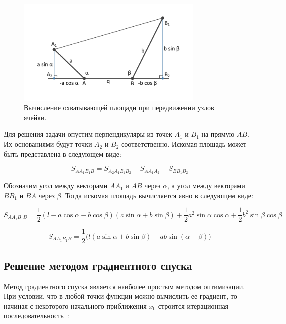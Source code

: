 \documentclass[
11pt,%
tightenlines,%
twoside,%
onecolumn,%
nofloats,%
nobibnotes,%
nofootinbib,%
superscriptaddress,%
noshowpacs,%
centertags]%
{revtex4}
\begin{document}
\begin{figure}[h]
\setcaptionmargin{5mm}
\onelinecaptionstrue
\includegraphics[width=0.8\textwidth]{pics/local.pdf}
\caption{Вычисление охватывающей площади при передвижении узлов ячейки.}
\label{fig:local}
\end{figure}

Для решения задачи опустим перпендикуляры из точек $A_1$ и $B_1$ на прямую $AB$.
Их основаниями будут точки $A_2$ и $B_2$ соответственно.
Искомая площадь может быть представлена в следующем виде:

\begin{equation}
S_{AA_1B_1B} = S_{A_2A_1B_1B_2} - S_{AA_1A_2} - S_{BB_1B_2}
\end{equation}

Обозначим угол между векторами $\overline{AA_1}$ и $\overline{AB}$ через $\alpha$, а угол между векторами $\overline{BB_1}$ и $\overline{BA}$ через $\beta$.
Тогда искомая площадь вычисляется явно в следующем виде:

\begin{equation}
S_{AA_1B_1B} = \frac{1}{2}(l - a \cos \alpha - b \cos \beta)(a \sin \alpha + b \sin \beta) + \frac{1}{2}a^2 \sin \alpha \cos \alpha + \frac{1}{2}b^2 \sin \beta \cos \beta
\end{equation}

\begin{equation}
S_{AA_1B_1B} = \frac{1}{2}\big(l(a \sin \alpha + b \sin \beta) - ab \sin(\alpha + \beta)\big)
\end{equation}

\subsection{Решение методом градиентного спуска}

Метод градиентного спуска является наиболее простым методом оптимизации.
При условии, что в любой точки функции можно вычислить ее градиент, то начиная с некоторого начального приближения $x_0$ строится итерационная последовательность~\cite{Polyak}:
\end{document}
